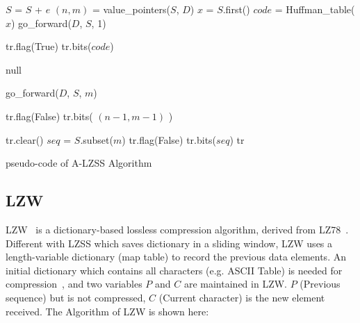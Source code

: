 \begin{algorithm}
\begin{algorithmic}[1]
\Input
\EndInput
\Output
\EndOutput

\State $S$ = $S$ + $e$  
\State $(n, m)$ = value\_pointers($S$, $D$)  
    \State $x$ = $S$.first()    
    \State $code$ = Huffman\_table($x$)
    \State go\_forward($D$, $S$, 1) 
    
    \State tr.flag(True)    
    \State tr.bits($code$)  
    
   
    \State \Return null     
    
\Else                       {}
    \State go\_forward($D$, $S$, $m$) 
    
    \State tr.flag(False)
    \State tr.bits( $(n-1, m-1)$ )  
\EndIf

 
    \State tr.clear()
    \State $seq$ = $S$.subset($m$) 
    \State tr.flag(False)
    \State tr.bits($seq$)   
\EndIf
\State \Return tr

\end{algorithmic}
\caption{pseudo-code of A-LZSS Algorithm}
\label{algo:A-LZSS}
\end{algorithm}

\subsection{LZW}
LZW~\cite{welch1984technique} is a dictionary-based lossless compression
algorithm, derived from LZ78~\cite{ziv1978compression}. Different with LZSS
which saves dictionary in a sliding window, LZW uses a length-variable
dictionary (map table) to record the previous data elements. An initial
dictionary which contains all characters (e.g. ASCII Table) is needed for
compression~\cite{welch1984technique}, and two variables $P$ and $C$ are
maintained in LZW. $P$ (Previous sequence) 
but is not compressed, $C$ (Current character) is the new element received. The
Algorithm of LZW is shown here:

